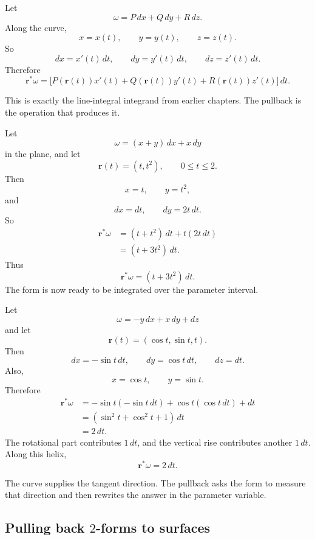 Let
\[
    \omega=P\,dx+Q\,dy+R\,dz.
\]
Along the curve,
\[
    x=x(t),
    \qquad
    y=y(t),
    \qquad
    z=z(t).
\]
So
\[
    dx=x'(t)\,dt,
    \qquad
    dy=y'(t)\,dt,
    \qquad
    dz=z'(t)\,dt.
\]
Therefore
\[
\boxed{
    \mathbf r^*\omega
    =
    \bigl[
        P(\mathbf r(t))x'(t)
        +
        Q(\mathbf r(t))y'(t)
        +
        R(\mathbf r(t))z'(t)
    \bigr]\,dt.
}
\]

This is exactly the line-integral integrand from earlier chapters.  The pullback is the
operation that produces it.

\begin{example}
Let
\[
    \omega=(x+y)\,dx+x\,dy
\]
in the plane, and let
\[
    \mathbf r(t)=(t,t^2),
    \qquad
    0\le t\le2.
\]
Then
\[
    x=t,
    \qquad
    y=t^2,
\]
and
\[
    dx=dt,
    \qquad
    dy=2t\,dt.
\]
So
\[
\begin{aligned}
    \mathbf r^*\omega
    &=
    (t+t^2)\,dt+t(2t\,dt)\\
    &=
    (t+3t^2)\,dt.
\end{aligned}
\]
Thus
\[
\boxed{
    \mathbf r^*\omega=(t+3t^2)\,dt.
}
\]
The form is now ready to be integrated over the parameter interval.
\end{example}

\begin{example}
Let
\[
    \omega=-y\,dx+x\,dy+dz
\]
and let
\[
    \mathbf r(t)=(\cos t,\sin t,t).
\]
Then
\[
    dx=-\sin t\,dt,
    \qquad
    dy=\cos t\,dt,
    \qquad
    dz=dt.
\]
Also,
\[
    x=\cos t,
    \qquad
    y=\sin t.
\]
Therefore
\[
\begin{aligned}
    \mathbf r^*\omega
    &=
    -\sin t(-\sin t\,dt)
    +
    \cos t(\cos t\,dt)
    +
    dt\\
    &=
    (\sin^2t+\cos^2t+1)\,dt\\
    &=
    2\,dt.
\end{aligned}
\]
The rotational part contributes \(1\,dt\), and the vertical rise contributes another
\(1\,dt\).  Along this helix,
\[
\boxed{
    \mathbf r^*\omega=2\,dt.
}
\]
\end{example}

The curve supplies the tangent direction.  The pullback asks the form to measure that
direction and then rewrites the answer in the parameter variable.

\subsection{Pulling back \texorpdfstring{\(2\)}{2}-forms to surfaces}

